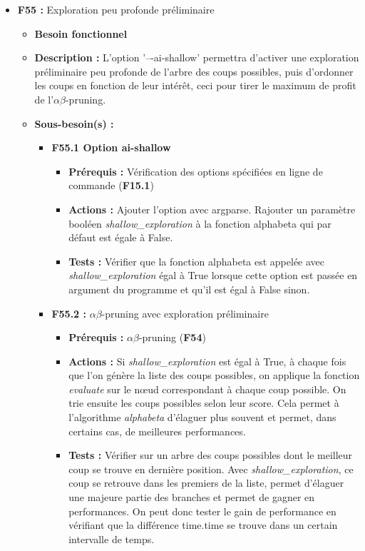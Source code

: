 \documentclass{article}
\begin{document}
\begin{itemize}
\begin{itemize}
    \end{itemize}
\bigskip
    \item \textbf{F55 :} Exploration peu profonde préliminaire
    \begin{itemize}
        \item \textbf{Besoin fonctionnel}
        \item \textbf{Description :} L’option ’–-ai-shallow’ permettra d’activer une exploration préliminaire peu profonde de l’arbre des coups possibles, puis d’ordonner les coups en fonction de leur intérêt, ceci pour tirer le maximum de profit de l’$\alpha\beta$-pruning.
        \item \textbf{Sous-besoin(s) :}
        \begin{itemize}
            \smallskip
            \item \textbf{F55.1 Option ai-shallow}
            \begin{itemize}
                \item \textbf{Prérequis :} Vérification des options spécifiées en ligne de commande (\textbf{F15.1})
                \item \textbf{Actions :} Ajouter l’option avec argparse. Rajouter un paramètre booléen \textit{shallow\_exploration} à la fonction alphabeta qui par défaut est égale à False.
                \item \textbf{Tests :} Vérifier que la fonction alphabeta est appelée avec \textit{shallow\_exploration} égal à True lorsque cette option est passée en argument du programme et qu’il est égal à False sinon.
            \end{itemize}
            \smallskip
            \item \textbf{F55.2 :} $\alpha\beta$-pruning avec exploration préliminaire
            \begin{itemize}
                \item \textbf{Prérequis :} $\alpha\beta$-pruning (\textbf{F54})
                \item \textbf{Actions :} Si \textit{shallow\_exploration} est égal à True, à chaque fois que l’on génère la liste des coups possibles, on applique la fonction \textit{evaluate} sur le nœud correspondant à chaque coup possible. On trie ensuite les coups possibles selon leur score. Cela permet à l’algorithme \textit{alphabeta} d’élaguer plus souvent et permet, dans certains cas, de meilleures performances.
                \item \textbf{Tests :} Vérifier sur un arbre des coups possibles dont le meilleur coup se trouve en dernière position. Avec \textit{shallow\_exploration}, ce coup se retrouve dans les premiers de la liste, permet d’élaguer une majeure partie des branches et permet de gagner en performances. On peut donc tester le gain de performance en vérifiant que la différence time.time se trouve dans un certain intervalle de temps.

\end{itemize}
\end{itemize}
\end{itemize}
\end{itemize}
\end{document}
